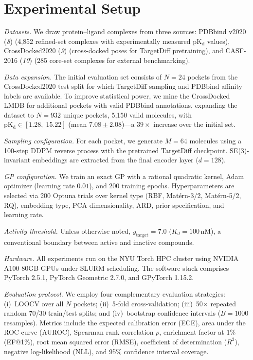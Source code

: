 \documentclass{article}
\newcommand{\ytarget}{y_{\mathrm{target}}}
\newcommand{\pKd}{\mathrm{pK_d}}
\newcommand{\scite}[1]{(\textit{#1})}
\begin{document}
\section{Experimental Setup}

\textit{Datasets.}
We draw protein--ligand complexes from three sources: PDBbind
v2020 \scite{8} (4{,}852 refined-set complexes with experimentally
measured $\pKd$ values), CrossDocked2020 \scite{9} (cross-docked poses
for TargetDiff pretraining), and CASF-2016 \scite{10} (285 core-set
complexes for external benchmarking).

\textit{Data expansion.}
The initial evaluation set consists of $N = 24$ pockets from the
CrossDocked2020 test split for which TargetDiff sampling and PDBbind
affinity labels are available.  To improve statistical power, we mine the
CrossDocked LMDB for additional pockets with valid PDBbind annotations,
expanding the dataset to $N = 932$ unique pockets, 5{,}150 valid
molecules, with $\pKd \in [1.28,\;15.22]$ (mean $7.08 \pm 2.08$)---a
$39\times$ increase over the initial set.

\textit{Sampling configuration.}
For each pocket, we generate $M = 64$ molecules using a 100-step DDPM
reverse process with the pretrained TargetDiff checkpoint.  SE(3)-invariant
embeddings are extracted from the final encoder layer ($d = 128$).

\textit{GP configuration.}
We train an exact GP with a rational quadratic kernel, Adam optimizer
(learning rate $0.01$), and 200 training epochs.  Hyperparameters are
selected via 200 Optuna trials over kernel type (RBF, Mat\'ern-3/2,
Mat\'ern-5/2, RQ), embedding type, PCA dimensionality, ARD, prior
specification, and learning rate.

\textit{Activity threshold.}
Unless otherwise noted, $\ytarget = 7.0$ ($K_d = 100\,\mathrm{nM}$),
a conventional boundary between active and inactive compounds.

\textit{Hardware.}
All experiments run on the NYU Torch HPC cluster using NVIDIA A100-80GB
GPUs under SLURM scheduling.  The software stack comprises PyTorch
2.5.1, PyTorch Geometric 2.7.0, and GPyTorch 1.15.2.

\textit{Evaluation protocol.}
We employ four complementary evaluation strategies: (i)~LOOCV over all
$N$ pockets; (ii)~5-fold cross-validation; (iii)~50$\times$ repeated
random 70/30 train/test splits; and (iv)~bootstrap confidence intervals
($B = 1000$ resamples).  Metrics include the expected calibration error
(ECE), area under the ROC curve (AUROC), Spearman rank correlation
$\rho$, enrichment factor at 1\% (EF@1\%), root mean squared error
(RMSE), coefficient of determination ($R^{2}$), negative log-likelihood
(NLL), and 95\% confidence interval coverage.
\end{document}
